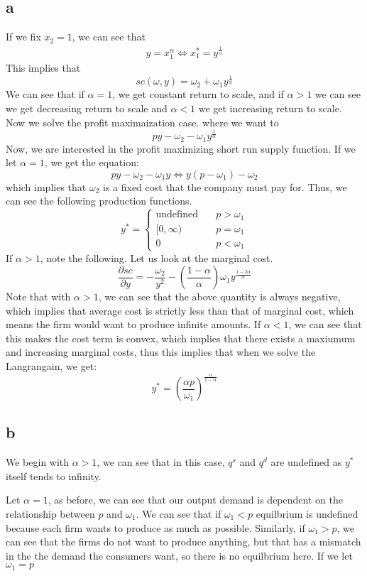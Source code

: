 \documentclass[11pt]{article}
\begin{document}
\subsection*{a}
If we fix $x_2 = 1$, we can see that 
\begin{align*}
    y = x^\alpha_1 \iff x_1^* = y^\frac{1}{\alpha}
\end{align*} 
This implies that 
\[
sc(\omega, y) = \omega_2 + \omega_1 y^\frac{1}{\alpha}
\]
We can see that if $\alpha = 1$, we get constant return to scale, and if $\alpha > 1$ we can see we get decreasing return to scale and $\alpha < 1$ we get increasing return to scale. Now we solve the profit maximaization case. where we want to 
\[
py - \omega_2 - \omega_1 y^\frac{1}{\alpha}
\]
Now, we are interested in the profit maximizing short run supply function. 
If we let $\alpha = 1$, we get the equation:
\[
py - \omega_2 - \omega_1 y \iff y(p - \omega_1) - \omega_2
\]
which implies that $\omega_2$ is a fixed cost that the company must pay for. Thus, we can see the following production functions.
\[
y^* = \begin{cases}
    \text{undefined} & \quad p > \omega_1\\
    [0,\infty) & \quad p = \omega_1\\
    0 & \quad p < \omega_1
\end{cases}
\]
If $\alpha > 1$, note the following. Let us look at the marginal cost. 
\[
\frac{\partial sc}{\partial y} = -\frac{\omega_2}{y^2} - \left( \frac{1-\alpha}{\alpha} \right)\omega_1 y^\frac{1- 2\alpha}{\alpha}
\]
Note that with $\alpha >1$, we can see that the above quantity is always negative, which implies that average cost is strictly less than that of marginal cost, which means the firm would want to produce infinite amounts. If $\alpha < 1$, we can see that this makes the cost term is convex, which implies that there exists a maxiumum and increasing marginal costs, thus this implies that when we solve the Langrangain, we get:
\[
y^* = \left( \frac{\alpha p}{\omega_1} \right)^\frac{\alpha}{1-\alpha}
\]
\subsection*{b}
We begin with $\alpha > 1$, we can see that in this case, $q^s$ and $q^d$ are undefined as $y^*$ itself tends to infinity. 


Let $\alpha = 1$, as before, we can see that our output demand is dependent on the relationship between $p$ and $\omega_1$. We can see that if $\omega_1 < p$ equilbrium is undefined because each firm wants to produce as much as possible. Similarly, if $\omega_1 > p$, we can see that the firms do not want to produce anything, but that has a mismatch in the the demand the consumers want, so there is no equilbrium here. If we let $\omega_1 = p$
\end{document}
